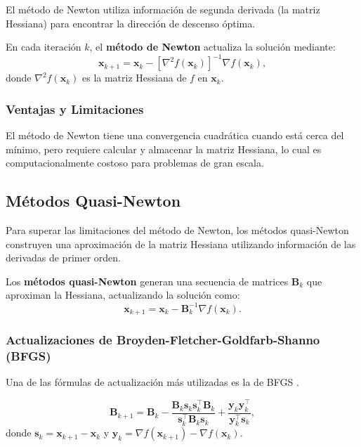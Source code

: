 El método de Newton utiliza información de segunda derivada (la matriz Hessiana) para encontrar la dirección de descenso óptima.

\begin{definicion}
\label{def:newton}
En cada iteración $k$, el \textbf{método de Newton} actualiza la solución mediante:
\begin{equation}
\mathbf{x}_{k+1} = \mathbf{x}_k - [\nabla^2 f(\mathbf{x}_k)]^{-1} \nabla f(\mathbf{x}_k),
\end{equation}
donde $\nabla^2 f(\mathbf{x}_k)$ es la matriz Hessiana de $f$ en $\mathbf{x}_k$.
\end{definicion}

\subsubsection{Ventajas y Limitaciones}

El método de Newton tiene una convergencia cuadrática cuando está cerca del mínimo, pero requiere calcular y almacenar la matriz Hessiana, lo cual es computacionalmente costoso para problemas de gran escala.

\subsection{Métodos Quasi-Newton}

Para superar las limitaciones del método de Newton, los métodos quasi-Newton construyen una aproximación de la matriz Hessiana utilizando información de las derivadas de primer orden.

\begin{definicion}
\label{def:quasi_newton}
Los \textbf{métodos quasi-Newton} generan una secuencia de matrices $\mathbf{B}_k$ que aproximan la Hessiana, actualizando la solución como:
\begin{equation}
\mathbf{x}_{k+1} = \mathbf{x}_k - \mathbf{B}_k^{-1} \nabla f(\mathbf{x}_k).
\end{equation}
\end{definicion}

\subsubsection{Actualizaciones de Broyden-Fletcher-Goldfarb-Shanno (BFGS)}

Una de las fórmulas de actualización más utilizadas es la de BFGS \cite{wright1999numerical}.

\begin{equation}
\mathbf{B}_{k+1} = \mathbf{B}_k - \frac{\mathbf{B}_k \mathbf{s}_k \mathbf{s}_k^\top \mathbf{B}_k}{\mathbf{s}_k^\top \mathbf{B}_k \mathbf{s}_k} + \frac{\mathbf{y}_k \mathbf{y}_k^\top}{\mathbf{y}_k^\top \mathbf{s}_k},
\end{equation}
donde $\mathbf{s}_k = \mathbf{x}_{k+1} - \mathbf{x}_k$ y $\mathbf{y}_k = \nabla f(\mathbf{x}_{k+1}) - \nabla f(\mathbf{x}_k)$.

